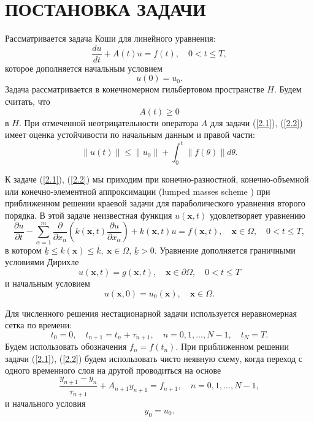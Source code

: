 \documentclass[12pt]{ncc}
\numberwithin{equation}{section}
\begin{document}
\section{ПОСТАНОВКА ЗАДАЧИ} 

Рассматривается задача Коши для линейного уравнения:
\begin{equation}\label{2.1}
  \frac{du}{dt} + A(t) u = f(t),
  \quad 0 < t \leq T, 
\end{equation} 
которое дополняется начальным условием
\begin{equation}\label{2.2}
  u(0) = u_0 .
\end{equation} 
Задача рассматривается в конечномерном гильбертовом пространстве $H$.
Будем считать, что 
\[
 A(t) \geq 0 
\] 
в $H$.
При отмеченной неотрицательности оператора $A$ для задачи (\ref{2.1}), (\ref{2.2})
имеет оценка устойчивости по начальным данным и правой части:
\begin{equation}\label{2.3}
  \|u(t)\| \leq \|u_0\| + \int_{0}^{t} \|f(\theta) \| d \theta .
\end{equation} 


К задаче (\ref{2.1}), (\ref{2.2}) мы приходим при конечно-разностной, конечно-объемной
или конечно-элементной аппроксимации (lumped masses scheme \cite{thomee2010galerkin}) 
при приближенном решении краевой задачи для параболического уравнения второго порядка.
В этой задаче неизвестная функция $u({\bm x},t)$
удовлетворяет уравнению
\[
   \frac{\partial u}{\partial t} 
   - \sum_{\alpha =1}^{m}
   \frac{\partial }{\partial x_\alpha} 
   \left ( k({\bm x},t)  \frac{\partial u}{\partial x_\alpha} \right ) + k({\bm x},t) u = f({\bm x},t),
   \quad {\bm x}\in \Omega,
   \quad 0 < t \leq  T,
\]
в котором 
$\underline{k} \leq k({\bm x}) \leq  \overline{k}, \ {\bm x} \in \Omega$,
$\underline{k} > 0$.
Уравнение дополняется граничными условиями Дирихле
\[
   u({\bm x},t) = g({\bm x},t),
   \quad {\bm x}\in \partial \Omega,
   \quad 0 < t \leq  T
\]
и начальным условием
\[
   u({\bm x},0) = u_0({\bm x}),
   \quad {\bm x}\in \Omega.
\]

Для численного решения нестационарной задачи используется неравномерная сетка по времени:
\[
 t_0=0, \quad t_{n+1} = t_n + \tau_{n+1},
 \quad n = 0,1, ..., N-1,
 \quad t_N = T .   
\] 
Будем использовать обозначения $f_n = f(t_n)$.
При приближенном решении задачи  (\ref{2.1}), (\ref{2.2}) будем использовать
чисто неявную схему, когда переход с одного временного слоя на другой
проводиться на основе 
\begin{equation}\label{2.4}
  \frac{y_{n+1} - y_{n}}{\tau_{n+1}} + A_{n+1} y_{n+1} = f_{n+1},
  \quad n = 0,1, ..., N-1, 
\end{equation} 
и начального условия
\begin{equation}\label{2.5}
 y_0 = u_0.
\end{equation} 
\end{document}
